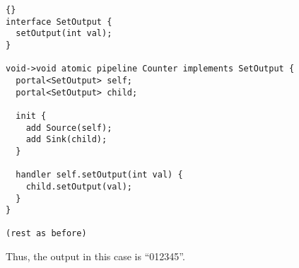 \begin{lstlisting}{}
interface SetOutput {
  setOutput(int val);
}

void->void atomic pipeline Counter implements SetOutput {
  portal<SetOutput> self;
  portal<SetOutput> child;

  init {
    add Source(self);
    add Sink(child);
  }

  handler self.setOutput(int val) {
    child.setOutput(val);
  }
}

(rest as before)
\end{lstlisting}{}

Thus, the output in this case is ``012345''.

\medskip{}






